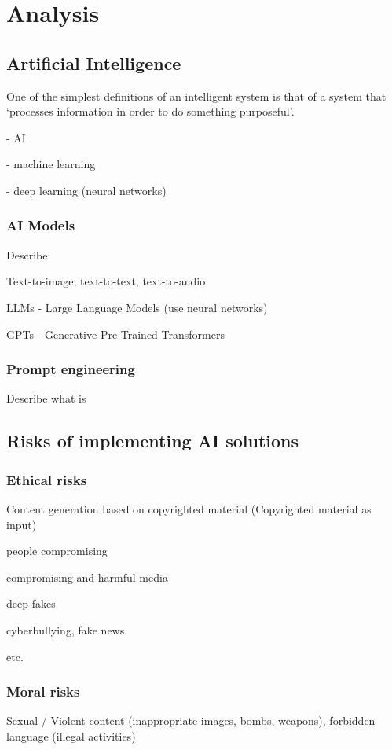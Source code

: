 \chapter{Analysis}

\section{Artificial Intelligence} %
One of the simplest definitions of an intelligent system is that of a system
that ‘processes information in order to do something purposeful’.\cite{Dignum_2019}






- AI

- machine learning

- deep learning (neural networks)

\subsection{AI Models}
Describe:

Text-to-image, text-to-text, text-to-audio

LLMs - Large Language Models (use neural networks)

GPTs - Generative Pre-Trained Transformers

\subsection{Prompt engineering}
Describe what is

\section{Risks of implementing AI solutions}

\subsection{Ethical risks}
Content generation based on copyrighted material (Copyrighted material as input)

people compromising 

compromising and harmful media 

deep fakes

cyberbullying, fake news

etc.

\subsection{Moral risks}
Sexual / Violent content (inappropriate images, bombs, weapons), forbidden language (illegal activities)

